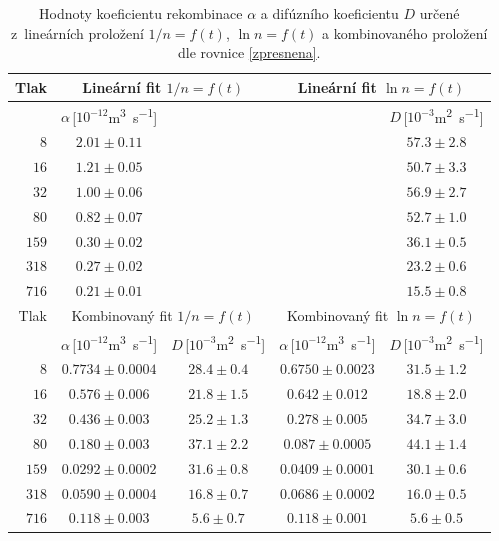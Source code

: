 \documentclass[a4paper,12pt]{article}
\begin{document}
\begin{table}[h]
	\centering
	\caption{Hodnoty koeficientu rekombinace $\alpha$ a difúzního koeficientu 
	$D$ určené z~lineárních proložení $1/n = f(t)$, $\ln n = f(t)$ a 
	kombinovaného proložení dle rovnice \eqref{zpresnena}.}
	\label{table:koef}
	\begin{tabular}{|r|c|c|c|c|}
		\hline
		Tlak & \multicolumn{2}{c|}{Lineární fit $1/n = f(t)$} & 
		\multicolumn{2}{c|}{Lineární fit $\ln n = f(t)$} \\ \hline
		[Pa] & $\alpha$\,[$10^{-12}$\si{\meter\cubed\per\second}] &&& 
		$D$\,[$10^{-3}$\si{\metre^2\second^{-1}}] \\ \hline
		$8$ & $2.01\pm0.11$ &&& $57.3\pm2.8$   
		\\ \hline
		$16$ & $1.21\pm0.05$ &&& $50.7\pm3.3$ 
		\\ \hline
		$32$ & $1.00\pm0.06$ &&& $56.9\pm2.7$ 
		\\ \hline
		$80$ & $0.82\pm0.07$ &&& $52.7\pm1.0$ 
		\\ \hline
		$159$ & $0.30\pm0.02$ &&& $36.1\pm0.5$ 
		\\ \hline
		$318$ & $0.27\pm0.02$ &&& $23.2\pm0.6$ 
		\\ \hline
		$716$ & $0.21\pm0.01$ &&& $15.5\pm0.8$ 
		\\ \hline\hline
		Tlak & \multicolumn{2}{c|}{Kombinovaný fit $1/n = f(t)$} & 
		\multicolumn{2}{c|}{Kombinovaný fit $\ln n = f(t)$} \\ \hline
		[Pa] & 
		$\alpha$\,[$10^{-12}$\si{\meter\cubed\per\second}] & 
		$D$\,[$10^{-3}$\si{\metre^2\second^{-1}}] & 
		$\alpha$\,[$10^{-12}$\si{\meter\cubed\per\second}] & 
		$D$\,[$10^{-3}$\si{\metre^2\second^{-1}}] \\ \hline
		$8$ & $0.7734\pm0.0004$ & $28.4\pm0.4$ & 
		$0.6750\pm0.0023$ & $31.5\pm1.2$ 
		\\ \hline
		$16$ & $0.576\pm0.006$ & $21.8\pm1.5$ & 
		$0.642\pm0.012$ & $18.8\pm2.0$
		\\ \hline
		$32$ & $0.436\pm0.003$ & $25.2\pm1.3$ & 
		$0.278\pm0.005$ & $34.7\pm3.0$
		\\ \hline
		$80$ & $0.180\pm0.003$ & $37.1\pm2.2$ & 
		$0.087\pm0.0005$ & $44.1\pm1.4$
		\\ \hline
		$159$ & $0.0292\pm0.0002$ & $31.6\pm0.8$ 
		& $0.0409\pm0.0001$ & $30.1\pm0.6$
		\\ \hline
		$318$ & $0.0590\pm0.0004$ & $16.8\pm0.7$ 
		& $0.0686\pm0.0002$ & $16.0\pm0.5$
		\\ \hline
		$716$ & $0.118\pm0.003$ & $5.6\pm0.7$ & 
		$0.118\pm0.001$ & $5.6\pm0.5$
		\\ \hline
	\end{tabular}
\end{table}
\clearpage
\end{document}
